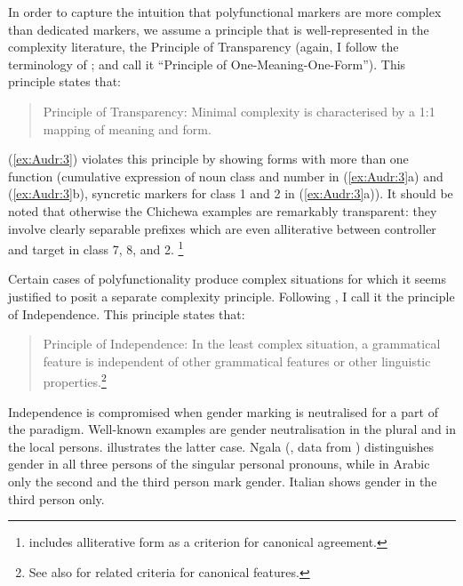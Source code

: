 \documentclass[output=collectionpaper]{langsci/langscibook}
\begin{document}
In order to capture the intuition that polyfunctional markers are more complex than dedicated markers, we assume a principle that is well-represented in the complexity literature, the Principle of Transparency (again, I follow the terminology of \citealt{Kusters2003}; \citealt{Miestamo2008} and  call it ``Principle of One-Meaning-One-Form''). This principle states that:

\begin{quote}
Principle of Transparency: Minimal complexity is characterised by a 1:1 mapping of meaning and form.
\end{quote}

‎(\ref{ex:Audr:3}) violates this principle by showing forms with more than one function (cumulative expression of noun class and number in (\ref{ex:Audr:3}a) and ‎(\ref{ex:Audr:3}b), syncretic markers for class 1 and 2 in ‎(\ref{ex:Audr:3}a)). It should be noted that otherwise the Chichewa examples are remarkably transparent: they involve clearly separable prefixes which are even alliterative between controller and target in class 7, 8, and 2.%
\footnote{\citet[15]{Corbett2006} includes alliterative form as a criterion for canonical agreement.}

Certain cases of polyfunctionality produce complex situations for which it seems justified to posit a separate complexity principle. Following \citet{DiGarbo2014,DiGarbo2016}, I call it the principle of Independence. This principle states that:

\begin{quote}
Principle of Independence: In the least complex situation, a grammatical feature is independent of other grammatical features or other linguistic properties.\footnote{See also \citet[170, 174]{Corbett2012} for related criteria for canonical features.}
\end{quote}

Independence is compromised when gender marking is neutralised for a part of the paradigm. Well-known examples are gender neutralisation in the plural and in the local persons.  illustrates the latter case. Ngala (\citealt{Siewierska2013}, data from \citealt{Laycock1965}) distinguishes gender in all three persons of the singular personal pronouns, while in Arabic \citep[298--299]{Ryding2005} only the second and the third person mark gender. Italian shows gender in the third person only.
\end{document}
